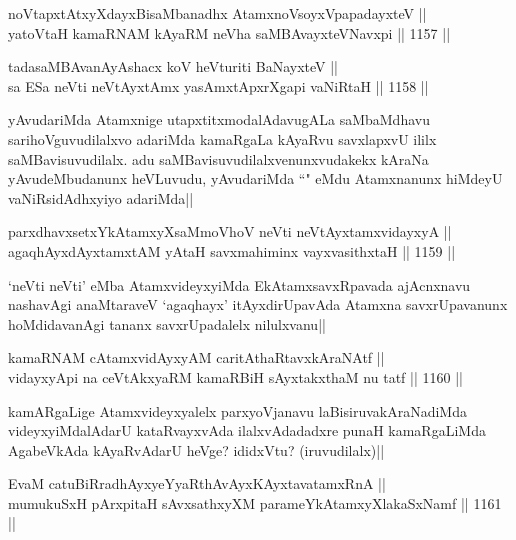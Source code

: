 
\begin{shl}
noVtapxtAtxyXdayxBisaMbanadhx AtamxnoV\s soyxVpapadayxteV || \\
yatoV\s taH kamaRNAM kAyaRM neVha saMBAvayxteV\s Navxpi ||  1157 ||  
\end{shl}
				
\begin{shl}
tadasaMBAvanAyAshacx koV heVturiti BaNayxteV || \\
sa ESa neVti neVtAyxtAmx yasAmxtApxrXgapi vaNiRtaH ||  1158 ||  
\end{shl}

\begin{artha}
yAvudariMda Atamxnige utapxtitxmodalAdavugALa saMbaMdhavu sarihoVguvudilalxvo adariMda kamaRgaLa kAyaRvu savxlapxvU ililx saMBavisuvudilalx. adu saMBavisuvudilalxvenunxvudakekx kAraNa yAvudeMbudanunx heVLuvudu, yAvudariMda ``\stext" eMdu Atamxnanunx hiMdeyU vaNiRsidAdhxyiyo adariMda||
\end{artha}

\begin{shl}
parxdhavxsetxYkAtamxyXsaMmoVhoV neVti neVtAyxtamxvidayxyA || \\
agaqhAyxdAyxtamxtAM yAtaH savxmahiminx vayxvasithxtaH ||  1159 ||  
\end{shl}

\begin{artha}
`neVti neVti' eMba AtamxvideyxyiMda EkAtamxsavxRpavada ajAcnxnavu nashavAgi anaMtaraveV `agaqhayx' itAyxdirUpavAda Atamxna savxrUpavanunx hoMdidavanAgi tananx savxrUpadalelx nilulxvanu||
\end{artha}


\begin{shl}
kamaRNAM cA\s \s tamxvidAyxyAM caritAthaRtavxkAraNAtf || \\
vidayxyA\s pi na ceVtAkxyaRM kamaRBiH sAyxtakxthaM nu tatf ||  1160 ||  
\end{shl}

\begin{artha}
kamARgaLige Atamxvideyxyalelx parxyoVjanavu laBisiruvakAraNadiMda videyxyiMdalAdarU kataRvayxvAda ilalxvAdadadxre punaH kamaRgaLiMda AgabeVkAda kAyaRvAdarU heVge? ididxVtu? (iruvudilalx)||
\end{artha}

\begin{shl}
EvaM catuBiRradhAyxyeYyaRthAvAyxKAyxtavatamxRnA || \\
mumukuSxH pArxpitaH sAvxsathxyXM parameYkAtamxyXlakaSxNamf ||  1161 ||  
\end{shl}

